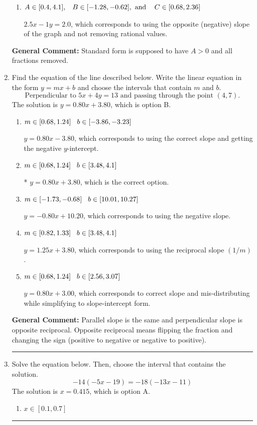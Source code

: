 \documentclass{extbook}[14pt]
\newcommand{\litem}[1]{\item #1

\rule{\textwidth}{0.4pt}}
\begin{document}
\begin{enumerate}
{\begin{enumerate}[label=\Alph*.]
 $5x - 2y = 4$, which corresponds to using the opposite (negative) slope of the graph, but did everything else correctly.
\item \( A \in [0.4, 4.1], \hspace{3mm} B \in [-1.28, -0.62], \text{ and } \hspace{3mm} C \in [0.68, 2.36] \)

 $2.5x - 1y = 2.0$, which corresponds to using the opposite (negative) slope of the graph and not removing rational values.
\end{enumerate}

\textbf{General Comment:} Standard form is supposed to have $A > 0$ and all fractions removed.
}
\litem{
Find the equation of the line described below. Write the linear equation in the form $ y=mx+b $ and choose the intervals that contain $m$ and $b$.
\[ \text{Perpendicular to } 5 x + 4 y = 13 \text{ and passing through the point } (4, 7). \]The solution is \( y = 0.80x + 3.80 \), which is option B.\begin{enumerate}[label=\Alph*.]
\item \( m \in [0.68, 1.24] \hspace*{3mm} b \in [-3.86, -3.23] \)

 $y = 0.80x - 3.80$, which corresponds to using the correct slope and getting the negative $y$-intercept.
\item \( m \in [0.68, 1.24] \hspace*{3mm} b \in [3.48, 4.1] \)

* $y = 0.80x + 3.80$, which is the correct option.
\item \( m \in [-1.73, -0.68] \hspace*{3mm} b \in [10.01, 10.27] \)

 $y = -0.80x + 10.20$, which corresponds to using the negative slope.
\item \( m \in [0.82, 1.33] \hspace*{3mm} b \in [3.48, 4.1] \)

 $y = 1.25x + 3.80$, which corresponds to using the reciprocal slope $(1/m)$.
\item \( m \in [0.68, 1.24] \hspace*{3mm} b \in [2.56, 3.07] \)

 $y = 0.80x + 3.00$, which corresponds to correct slope and mis-distributing while simplifying to slope-intercept form.
\end{enumerate}

\textbf{General Comment:} Parallel slope is the same and perpendicular slope is opposite reciprocal. Opposite reciprocal means flipping the fraction and changing the sign (positive to negative or negative to positive).
}
\litem{
Solve the equation below. Then, choose the interval that contains the solution.
\[ -14(-5x -19) = -18(-13x -11) \]The solution is \( x = 0.415 \), which is option A.\begin{enumerate}[label=\Alph*.]
\item \( x \in [0.1, 0.7] \)


\end{enumerate}}
\end{enumerate}
\end{document}
